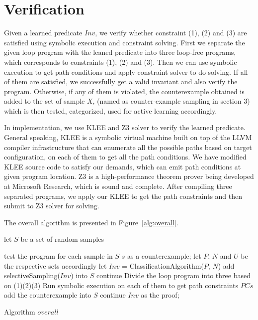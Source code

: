 
\section{Verification}
Given a learned predicate $Inv$, we verify whether constraint (1), (2) and (3) are satisfied using symbolic execution and constraint solving.
First we separate the given loop program with the leaned predicate into three loop-free programs,
which corresponds to constraints (1), (2) and (3). 
Then we can use symbolic execution to get path conditions and apply constraint solver to do solving.
If all of them are satisfied, we successfully get a valid invariant and also verify the program. 
Otherwise, if any of them is violated, the counterexample obtained is added to the set of sample $X$, (named as counter-example sampling in section 3)
which is then tested, categorized, used for active learning accordingly.

In implementation, we use KLEE and Z3 solver to verify the learned predicate.
General speaking, KLEE is a symbolic virtual machine built on top of the LLVM compiler infrastructure
that can enumerate all the possible paths based on target configuration, on each of them to get all the path conditions.
We have modified KLEE source code to satisfy our demands, which can emit path conditions at given program location.
Z3 is a high-performance theorem prover being developed at Microsoft Research, which is sound and complete.
After compiling three separated programs, we apply our KLEE to get the path constraints and then submit to Z3 solver for solving.


 
The overall algorithm is presented in Figure~\ref{alg:overall}.
\begin{algorithm}[t]
\SetAlgoVlined
\Indm
{}
\Indp
let $S$ be a set of random samples\;
 {
    test the program for each sample in $S$\;
     {
        \Return $s$ as a counterexample;
    }
    let $P$, $N$ and $U$ be the respective sets accordingly\;
    let $Inv$ = ClassificationAlgorithm($P$, $N$)\;
     {
        add selectiveSampling($Inv$) into $S$\;
        continue\;
    }
    Divide the loop program into three based on (1)(2)(3)\;
    Run symbolic execution on each of them to get path constraints $PCs$\;
     {
         {
            add the counterexample into $S$\;
            continue\;
        }
    }
    \Return $Inv$ as the proof;
    
}
\caption{Algorithm $overall$}
\label{alg:overall}
\end{algorithm}


